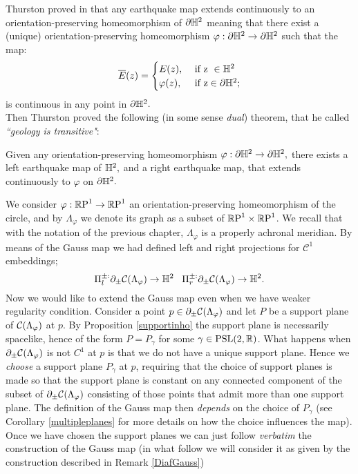 Thurston proved in \cite{thurston1986earthquakes} that any earthquake map extends continuously to an orientation-preserving homeomorphism of $\partial\H^2$ meaning that there exist a (unique) orientation-preserving homeomorphism $\varphi:\partial\H^2\to\partial\H^2$ such that the map:
    \[
        \overline{E}(z)=\begin{cases}
            E(z), &\text{ if z }\in \H^2\\
            \varphi(z), &\text{ if z}\in \partial\H^2  ;\\
            
        \end{cases}
    \]
    is continuous in any point in $\partial\H^2.$\\

    Then Thurston proved the following (in some sense \textit{dual}) theorem, that he called \textit{``geology is transitive"}:

    \begin{theorem}\label{earttheorem}
        Given any orientation-preserving homeomorphism $\varphi:\partial\H^2\to\partial\H^2,$ there exists a left earthquake map of $\H^2,$ and a right earthquake map, that extends continuously to $\varphi$ on $\partial\H^2.$
    \end{theorem}
    

We consider $\varphi:\S\to\S$ an orientation-preserving homeomorphism of the circle, and by $\Lambda_\varphi$ we denote its graph as a subset of $\T$. We recall that with the notation of the previous chapter, $\Lambda_\varphi$ is a properly achronal meridian. By means of the Gauss map we had defined left and right projections for $\mathcal{C}^1$ embeddings; 
\[
    \Pi_l^{\pm:}\partial_\pm\CF\to\H^2 \;\;\; \Pi_r^{\pm:}\partial_\pm\CF\to\H^2.
\]
Now we would like to extend the Gauss map even when we have weaker regularity condition. Consider a point $p \in \partial_\pm\CF$ and let $P$ be a support plane of $\CF$ at $p$. By Proposition \ref{supportinho} the support plane is necessarily spacelike, hence of the form $P=P_\gamma$ for some $\gamma\in\PSL$. What happens when $\partial_\pm\CF$ is not $C^1$ at $p$ is that we do not have a unique support plane. Hence we \textit{choose} a support plane $P_\gamma$ at $p$, requiring that the choice of support planes is made so that the support plane is constant on any connected component of the subset of $\partial_\pm\CF$ consisting of those points that admit more than one support plane. The definition of the Gauss map then \textit{depends} on the choice of $P_\gamma$ (see Corollary \ref{multipleplanes} for more details on how the choice influences the map). Once we have chosen the support planes we can just follow \textit{verbatim} the construction of the Gauss map (in what follow we will consider it as given by the construction described in Remark \ref{DiafGauss})

